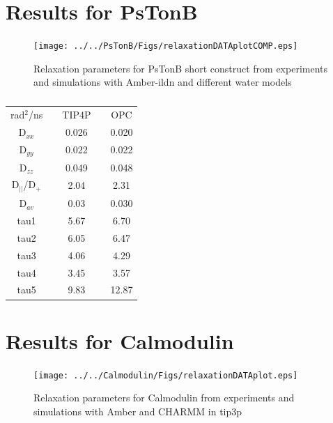 \documentclass[pre,aps,floatfix,authordate1-4,twocolumn]{revtex4-1}
\begin{document}
\newpage


\section{Results for PsTonB}

\begin{figure}[!h]
  \texttt{[image: ../../PsTonB/Figs/relaxationDATAplotCOMP.eps]}%
  \caption{Relaxation parameters for PsTonB short construct from
    experiments and simulations with Amber-ildn and different water models
    \label{hexPHASEdimensionsPLOT}}%
\end{figure}

\begin{table}[htb]
\centering
\caption{
}\label{ROTdiffCOEFFS}
\begin{tabular}{c c c c c}
rad$^2$/ns   &   &        TIP4P    &          &          OPC \\
D$_{xx}$ & &        0.026  & &         0.020 \\
D$_{yy}$  & &         0.022	 & &  0.022 \\
D$_{zz}$   & &       0.049	 & &  0.048 \\
D$_||$/D$_+$   & &   2.04	& &   2.31 \\
D$_{av}$    & &      0.03   & &       0.030 \\
tau1     & &     5.67	 & &         6.70 \\
tau2     & &     6.05	 & &         6.47 \\
tau3     & &     4.06	 & &         4.29 \\
tau4      & &    3.45	 & &         3.57 \\
tau5      & &    9.83	 & &         12.87 \\
\end{tabular}
\end{table}

\section{Results for Calmodulin}

\begin{figure}[!h]
  \texttt{[image: ../../Calmodulin/Figs/relaxationDATAplot.eps]}%
  \caption{Relaxation parameters for Calmodulin from
    experiments and simulations with Amber and CHARMM in tip3p
    \label{hexPHASEdimensionsPLOT}}%
\end{figure}
\end{document}

